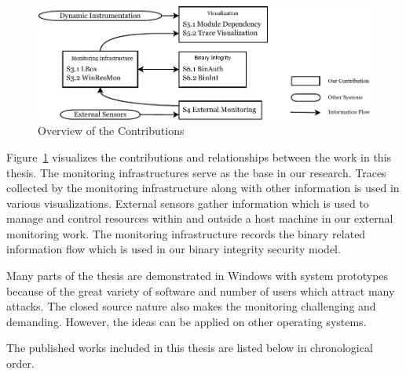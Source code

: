 \begin{figure}[htb]
\centering
\includegraphics[width=1.0\textwidth]{overview.pdf}
\caption{Overview of the Contributions}
\label{fig:overview}
\end{figure}

Figure~\ref{fig:overview} visualizes the contributions and relationships between
the work in this thesis.
The monitoring infrastructures serve as the base in our research.
Traces collected by the monitoring infrastructure along with other information is used
in various visualizations.
External sensors gather information which is used to manage and control resources within and outside
a host machine in our external monitoring work.
The monitoring infrastructure records the binary related information flow
which is used in our binary integrity security model.

Many parts of the thesis are demonstrated in Windows with system prototypes because of the great
variety of software and number of users which attract many attacks.
The closed source nature also makes the monitoring challenging and
demanding.
However, the ideas can be applied on other operating systems.

The published works included in this thesis are listed below in
chronological order.

